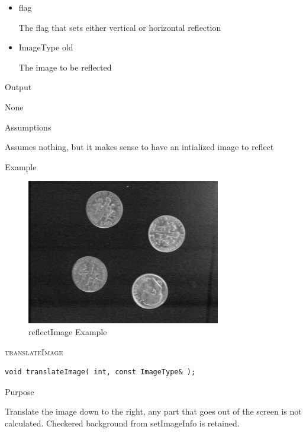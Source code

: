 \documentclass[pdftex, 11pt]{article}
\begin{document}
\begin{description}
\begin{description}
				\begin{itemize}

					\item{flag}

						The flag that sets either vertical or
						horizontal reflection

					\item{ImageType old}

						The image to be reflected

				\end{itemize}

			\item{Output}

				None

			\item{Assumptions}

				Assumes nothing, but it makes sense to have an intialized
				image to reflect

			\item{Example}

				\begin{figure}[ht!]
					\centering
					\caption{reflectImage Example}
				\includegraphics{images/outreflect.png}
			\end{figure}

		\end{description}


	\item{\textsc{translateImage}}
		\begin{description}

\begin{lstlisting}
void translateImage( int, const ImageType& );
\end{lstlisting}

			\item{Purpose}

				Translate the image down to the right,
				any part that goes out of the screen is
 				not calculated.  Checkered background from
				setImageInfo is retained.


\end{description}
\end{description}
\end{document}

